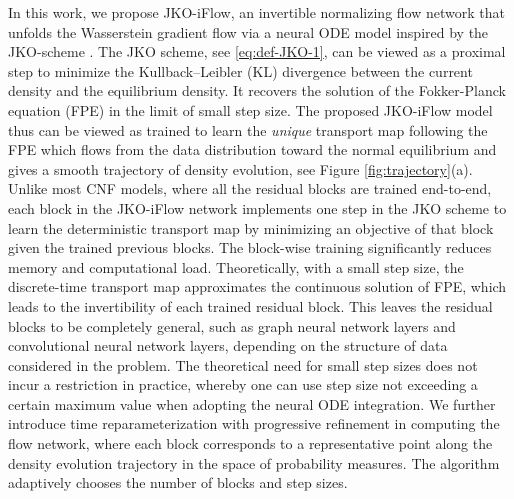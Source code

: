\documentclass{article}
\theoremstyle{remark}
\theoremstyle{plain}
\newcommand{\JKO}{JKO-iFlow}
\newcommand{\revold}[1]{{\color{black}#1}}
\begin{document}
In this work, we propose \JKO{}, 
an invertible normalizing flow network that unfolds the Wasserstein gradient flow via a neural ODE model inspired by the JKO-scheme \cite{jordan1998variational}. 
% 
The JKO scheme, see \eqref{eq:def-JKO-1}, can be viewed as a proximal step 
%
to minimize the Kullback–Leibler (KL) divergence 
% 
between the current density and the equilibrium density. It recovers the solution of the Fokker-Planck equation \revold{(FPE)} in the limit of small step size. 
%
The proposed \JKO{} model thus can be viewed as trained to learn the {\it unique} transport map following the FPE
which flows from the data distribution toward the normal equilibrium and gives a smooth trajectory of density evolution, see Figure \ref{fig:trajectory}(a).
%
Unlike most CNF models, where all the residual blocks are 
%
trained end-to-end, 
each block in the \JKO{} network implements one step in the JKO scheme \revold{to learn the deterministic transport map} by minimizing an objective of that block given the trained previous blocks.
The block-wise training significantly reduces memory and computational load.
%
\revold{ 
Theoretically, with a small step size, the discrete-time transport map approximates the continuous solution of FPE, 
which leads to the invertibility of each trained residual block.
%
This leaves the residual blocks to be completely general, such as graph neural network layers and convolutional neural network layers, depending on the structure of data considered in the problem.
%
The theoretical need for small step sizes 
%
does not incur a restriction in practice,
whereby one can use step size not exceeding a certain maximum value
when adopting the neural ODE integration.}
%
We further introduce time reparameterization with progressive refinement in computing the flow network, where each block corresponds to a representative point along the density evolution trajectory in the space of probability measures. 
\revold{The algorithm adaptively chooses the number of blocks and step sizes.}
%
\end{document}
